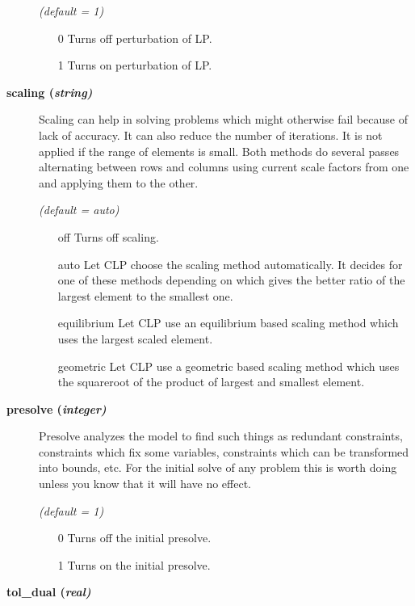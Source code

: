 \begin{description}
\textsl{(default = 1)}
\begin{itemize}
\item[0] 
Turns off perturbation of LP.
\item[1] 
Turns on perturbation of LP.
\end{itemize}

\item[\label{scaling}\hypertarget{scaling}
{\textbf{scaling (\slshape{string})}}]\hspace{1.0in}

Scaling can help in solving problems which might otherwise fail because of lack of accuracy.
It can also reduce the number of iterations.
It is not applied if the range of elements is small.
Both methods do several passes alternating between rows and columns using current scale factors from one and applying them to the other.

\textsl{(default = auto)}
\begin{itemize}
\item[off] 
Turns off scaling.
\item[auto] 
Let CLP choose the scaling method automatically.
It decides for one of these methods depending on which gives the better ratio of the largest element to the smallest one.
\item[equilibrium] 
Let CLP use an equilibrium based scaling method which uses the largest scaled element.
\item[geometric] 
Let CLP use a geometric based scaling method which uses the squareroot of the product of largest and smallest element.
\end{itemize}

\item[\label{presolve}\hypertarget{presolve}
{\textbf{presolve (\slshape{integer})}}]\hspace{1.0in}

Presolve analyzes the model to find such things as redundant constraints, constraints which fix some variables, constraints which can be transformed into bounds, etc.
For the initial solve of any problem this is worth doing unless you know that it will have no effect.

\textsl{(default = 1)}
\begin{itemize}
\item[0] 
Turns off the initial presolve.
\item[1] 
Turns on the initial presolve.
\end{itemize}

\item[\label{tol_dual}\hypertarget{tol_dual}
{\textbf{tol\_dual (\slshape{real})}}]\hspace{1.0in}


\end{description}
